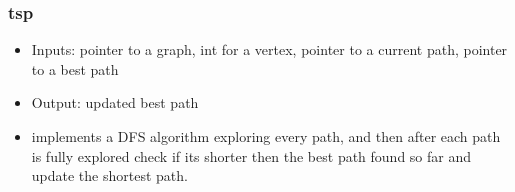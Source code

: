 \documentclass{article}
\begin{document}
\subsubsection{tsp}
\begin{itemize}
    \item Inputs: pointer to a graph, int for a vertex, pointer to a current path, pointer to a best path
    \item Output: updated best path 
    \item implements a DFS algorithm exploring every path, and then after each path is fully explored check if its shorter then the best path found so far and update the shortest path. 
\end{itemize}


\end{document}
